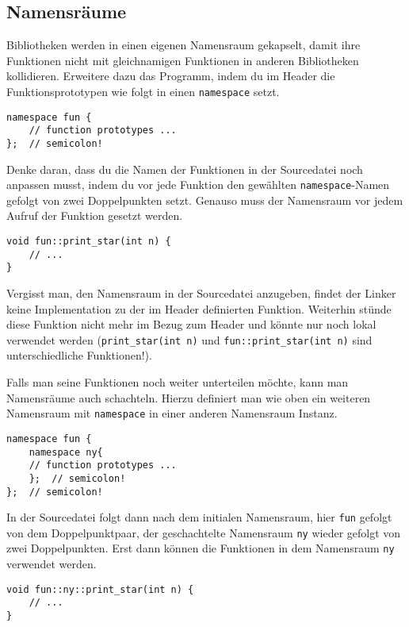 \subsection{Namensräume}
Bibliotheken werden in einen eigenen Namensraum gekapselt, damit ihre Funktionen nicht mit gleichnamigen Funktionen in anderen Bibliotheken kollidieren.
Erweitere dazu das Programm, indem du im Header die Funktionsprototypen wie
folgt in einen \lstinline{namespace} setzt.

\begin{lstlisting}
namespace fun {
    // function prototypes ...
};  // semicolon!
\end{lstlisting}

Denke daran, dass du die Namen der Funktionen in der Sourcedatei noch anpassen musst, indem du vor jede Funktion den gewählten \lstinline{namespace}-Namen gefolgt von zwei Doppelpunkten setzt.
Genauso muss der Namensraum vor jedem Aufruf der Funktion gesetzt werden.

\begin{lstlisting}
void fun::print_star(int n) {
    // ...
}
\end{lstlisting}

Vergisst man, den Namensraum in der Sourcedatei anzugeben, findet der Linker keine Implementation zu der im Header definierten Funktion.
Weiterhin stünde diese Funktion nicht mehr im Bezug zum Header und könnte nur noch lokal verwendet werden (\lstinline{print_star(int n)} und \lstinline{fun::print_star(int n)} sind unterschiedliche Funktionen!). \\ \smallskip

Falls man seine Funktionen noch weiter unterteilen möchte, kann man Namensräume auch schachteln.
Hierzu definiert man wie oben ein weiteren Namensraum mit \lstinline{namespace} in einer anderen Namensraum Instanz.

\begin{lstlisting}
namespace fun {
    namespace ny{
    // function prototypes ...
    };  // semicolon!
};  // semicolon!
\end{lstlisting}

In der Sourcedatei folgt dann nach dem initialen Namensraum, hier \lstinline{fun} gefolgt von dem Doppelpunktpaar, der geschachtelte Namensraum \lstinline{ny} wieder gefolgt von zwei Doppelpunkten.
Erst dann können die Funktionen in dem Namensraum \lstinline{ny} verwendet werden.

\begin{lstlisting}
void fun::ny::print_star(int n) {
    // ...
}
\end{lstlisting}

